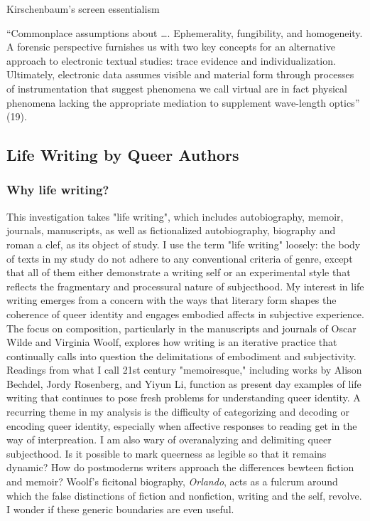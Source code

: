 \documentclass[11pt]{article}
\begin{document}
Kirschenbaum's screen essentialism

“Commonplace assumptions about …. Ephemerality, fungibility, and
homogeneity. A forensic perspective furnishes us with two key concepts
for an alternative approach to electronic textual studies: trace
evidence and individualization. Ultimately, electronic data assumes
visible and material form through processes of instrumentation that
suggest phenomena we call virtual are in fact physical phenomena
lacking the appropriate mediation to supplement wave-length optics”
(19).

\subsection{Life Writing by Queer Authors}
\label{sec:org45316f5}
\subsubsection{Why life writing?}
\label{sec:org17d68c3}

This investigation takes "life writing", which includes autobiography,
memoir, journals, manuscripts, as well as fictionalized autobiography,
biography and roman a clef, as its object of study. I use the term
"life writing" loosely: the body of texts in my study do not adhere to
any conventional criteria of genre, except that all of them either
demonstrate a writing self or an experimental style that reflects the
fragmentary and processural nature of subjecthood. My interest in life
writing emerges from a concern with the ways that literary form shapes
the coherence of queer identity and engages embodied affects in
subjective experience. The focus on composition, particularly in the
manuscripts and journals of Oscar Wilde and Virginia Woolf, explores
how writing is an iterative practice that continually calls into
question the delimitations of embodiment and subjectivity. Readings
from what I call 21st century "memoiresque," including works by Alison
Bechdel, Jordy Rosenberg, and Yiyun Li, function as present day
examples of life writing that continues to pose fresh problems for
understanding queer identity. A recurring theme in my analysis is the
difficulty of categorizing and decoding or encoding queer identity,
especially when affective responses to reading get in the way of
interpreation. I am also wary of overanalyzing and delimiting queer
subjecthood. Is it possible to mark queerness as legible so that it
remains dynamic? How do postmoderns writers approach the differences
bewteen fiction and memoir? Woolf's ficitonal biography, \emph{Orlando},
acts as a fulcrum around which the false distinctions of fiction and
nonfiction, writing and the self, revolve. I wonder if these generic
boundaries are even useful.
\end{document}
